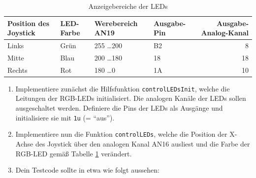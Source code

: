 \begin{table}[!htb]
    \centering
    \caption{Anzeigebereiche der LEDs}
    \label{tab:controlLED}
    \begin{tabular}{llllr}
        \toprule
        \textbf{Position des Joystick} & \textbf{LED-Farbe} & \textbf{Werebereich AN19} & \textbf{Ausgabe-Pin} & \textbf{Ausgabe-Analog-Kanal}\\
        \midrule
        Links & Grün & 255 \dots 200 & B2 & 8\\
        Mitte & Blau & 200 \dots 180 & 18 & 18\\
        Rechts & Rot & 180 \dots 0 & 1A & 10\\
        \bottomrule
    \end{tabular}
\end{table}

\begin{enumerate}
\item
Implementiere zunächst die Hilfsfunktion \lstinline|controlLEDsInit|, welche die Leitungen der RGB-LEDs initialisiert. Die analogen Kanäle der LEDs sollen ausgeschaltet werden.
Definiere die Pins der LEDs als Ausgänge und initialisiere sie mit \lstinline|1u| (= \enquote{aus}). 

\item
Implementiere nun die Funktion \lstinline|controlLEDs|, welche die Position der X-Achse des Joystick über den analogen Kanal AN16 ausliest und die Farbe der RGB-LED gemäß Tabelle \ref{tab:controlLED} verändert. 

\item 
Dein Testcode sollte in etwa wie folgt aussehen:

\end{enumerate}
